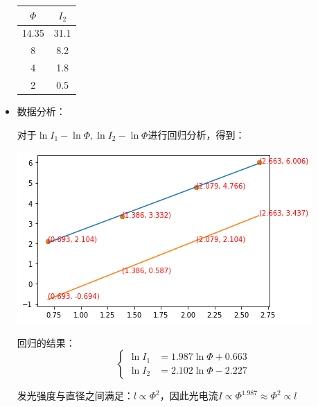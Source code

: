 \documentclass[a4paper]{ltxdoc}
\newenvironment{Figure}
  {\par\medskip\noindent\minipage{\linewidth}}
  {\endminipage\par\medskip}
\begin{document}
\begin{multicols}{2}
\begin{itemize}
\begin{Figure}
                  \smallskip
                  \begin{tabular}{|c|c|}
                      \hline $\Phi$ & $I_2$ \\
                      \hline 14.35  & 31.1  \\
                      \hline 8      & 8.2   \\
                      \hline 4      & 1.8   \\
                      \hline 2      & 0.5   \\
                      \hline
                  \end{tabular}
              \end{Figure}
        \item 数据分析：


              对于$\ln I_1 - \ln \Phi,\ln I_2 - \ln \Phi$进行回归分析，得到：
              \begin{Figure}
                  \centering
                  \includegraphics[width=\linewidth]{3.png}
              \end{Figure}
              回归的结果：
              $$
                  \left\{
                  \begin{aligned}
                      \ln I_1 & = 1.987 \ln \Phi +0.663 \\
                      \ln I_2 & = 2.102 \ln \Phi -2.227
                  \end{aligned}
                  \right.
              $$

              发光强度与直径之间满足：$l \propto \Phi ^2$，因此光电流$I \propto \Phi ^{1.987} \approx \Phi ^2 \propto l$
    \end{itemize}

\end{multicols}
\end{document}
